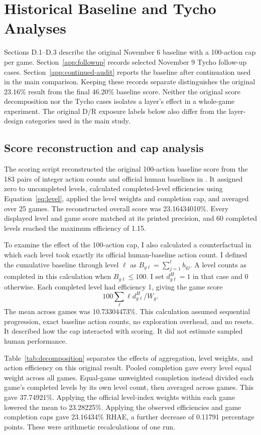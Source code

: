 \section{Historical Baseline and Tycho Analyses}\label{app:analysis}
Sections D.1--D.3 describe the original November 6 baseline with a 100-action cap per game. Section~\ref{app:followup} records selected November 9 Tycho follow-up cases. Section~\ref{app:continued-audit} reports the baseline after continuation used in the main comparison. Keeping these records separate distinguishes the original 23.16\% result from the final 46.20\% baseline score. Neither the original score decomposition nor the Tycho cases isolates a layer's effect in a whole-game experiment. The original D/R exposure labels below also differ from the layer-design categories used in the main study.

\subsection{Score reconstruction and cap analysis}
The scoring script reconstructed the original 100-action baseline score from the 183 pairs of integer action counts and official human baselines in . It assigned zero to uncompleted levels, calculated completed-level efficiencies using Equation~\eqref{eq:level}, applied the level weights and completion cap, and averaged over 25 games. The reconstructed overall score was 23.16434010\%. Every displayed level and game score matched at its printed precision, and 60 completed levels reached the maximum efficiency of 1.15.

To examine the effect of the 100-action cap, I also calculated a counterfactual in which each level took exactly its official human-baseline action count. I defined the cumulative baseline through level $\ell$ as $B_{g\ell}=\sum_{j=1}^{\ell}b_{gj}$. A level counts as completed in this calculation when $B_{g\ell}\leq100$. I set $d^{H}_{g\ell}=1$ in that case and 0 otherwise. Each completed level had efficiency 1, giving the game score
\[
100\sum_\ell \ell d^{H}_{g\ell}/W_g.
\]
The mean across games was 10.73304473\%. This calculation assumed sequential progression, exact baseline action counts, no exploration overhead, and no resets. It described how the cap interacted with scoring. It did not estimate sampled human performance.

Table~\ref{tab:decomposition} separates the effects of aggregation, level weights, and action efficiency on this original result. Pooled completion gave every level equal weight across all games. Equal-game unweighted completion instead divided each game's completed levels by its own level count, then averaged across games. This gave 37.74921\%. Applying the official level-index weights within each game lowered the mean to 23.28225\%. Applying the observed efficiencies and game completion caps gave 23.16434\% RHAE, a further decrease of 0.11791 percentage points. These were arithmetic recalculations of one run.


